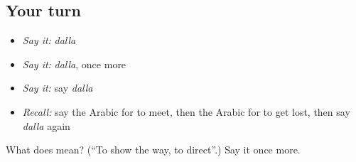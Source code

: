 \subsection*{Your turn}
\begin{itemize}
\raggedright
  \item \emph{Say it:} \emph{dalla}
  \item \emph{Say it:} \emph{dalla}, once more
  \item \emph{Say it:} say \emph{dalla}
  \item \emph{Recall:} say the Arabic for to meet, then the Arabic for to get lost, then say \emph{dalla} again
\end{itemize}

\begin{tcolorbox}[breakable,colback=teal!4,colframe=teal!35!black,title={Before you move on}]
What does  mean? (\textquotedblleft{}To show the way, to direct\textquotedblright{}.) Say it once more.
\end{tcolorbox}
